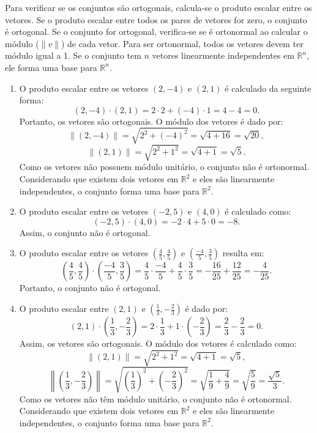 \begin{resolution}
  Para verificar se os conjuntos são ortogonais, calcula-se o produto escalar entre os vetores. Se o produto escalar entre todos os pares de vetores for zero, o conjunto é ortogonal. Se o conjunto for ortogonal, verifica-se se é ortonormal ao calcular o módulo (\(\|v\|\)) de cada vetor. Para ser ortonormal, todos os vetores devem ter módulo igual a 1. Se o conjunto tem \(n\) vetores linearmente independentes em \(\mathbb{R}^n\), ele forma uma base para \(\mathbb{R}^n\).

  \begin{enumerate}[label=\alph*)]
    \item O produto escalar entre os vetores \((2, -4)\) e \((2, 1)\) é calculado da seguinte forma:
          \[
            (2, -4) \cdot (2, 1) = 2 \cdot 2 + (-4) \cdot 1 = 4 - 4 = 0.
          \]
          Portanto, os vetores são ortogonais. O módulo dos vetores é dado por:
          \[
            \|(2, -4)\| = \sqrt{2^2 + (-4)^2} = \sqrt{4 + 16} = \sqrt{20},
          \]
          \[
            \|(2, 1)\| = \sqrt{2^2 + 1^2} = \sqrt{4 + 1} = \sqrt{5}.
          \]
          Como os vetores não possuem módulo unitário, o conjunto não é ortonormal. Considerando que existem dois vetores em \(\mathbb{R}^2\) e eles são linearmente independentes, o conjunto forma uma base para \(\mathbb{R}^2\).

    \item O produto escalar entre os vetores \((-2, 5)\) e \((4, 0)\) é calculado como:
          \[
            (-2, 5) \cdot (4, 0) = -2 \cdot 4 + 5 \cdot 0 = -8.
          \]
          Assim, o conjunto não é ortogonal.

    \item O produto escalar entre os vetores \(\left(\frac{4}{5}, \frac{4}{5}\right)\) e \(\left(\frac{-4}{5}, \frac{3}{5}\right)\) resulta em:
          \[
            \left(\frac{4}{5}, \frac{4}{5}\right) \cdot \left(\frac{-4}{5}, \frac{3}{5}\right) = \frac{4}{5} \cdot \frac{-4}{5} + \frac{4}{5} \cdot \frac{3}{5} = -\frac{16}{25} + \frac{12}{25} = -\frac{4}{25}.
          \]
          Portanto, o conjunto não é ortogonal.

    \item O produto escalar entre \((2, 1)\) e \(\left(\frac{1}{3}, -\frac{2}{3}\right)\) é dado por:
          \[
            (2, 1) \cdot \left(\frac{1}{3}, -\frac{2}{3}\right) = 2 \cdot \frac{1}{3} + 1 \cdot \left(-\frac{2}{3}\right) = \frac{2}{3} - \frac{2}{3} = 0.
          \]
          Assim, os vetores são ortogonais. O módulo dos vetores é calculado como:
          \[
            \|(2, 1)\| = \sqrt{2^2 + 1^2} = \sqrt{4 + 1} = \sqrt{5},
          \]
          \[
            \left\|\left(\frac{1}{3}, -\frac{2}{3}\right)\right\| = \sqrt{\left(\frac{1}{3}\right)^2 + \left(-\frac{2}{3}\right)^2} = \sqrt{\frac{1}{9} + \frac{4}{9}} = \sqrt{\frac{5}{9}} = \frac{\sqrt{5}}{3}.
          \]
          Como os vetores não têm módulo unitário, o conjunto não é ortonormal. Considerando que existem dois vetores em \(\mathbb{R}^2\) e eles são linearmente independentes, o conjunto forma uma base para \(\mathbb{R}^2\).


\end{enumerate}
\end{resolution}
